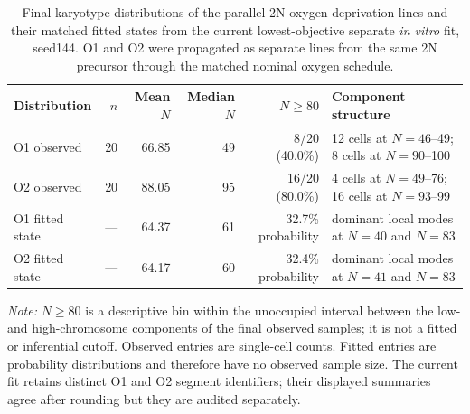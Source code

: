 \begin{table}[!htbp]
\centering
\small
\setlength{\tabcolsep}{5pt}
\caption{Final karyotype distributions of the parallel 2N oxygen-deprivation lines and their matched fitted states from the current lowest-objective separate \textit{in vitro} fit, seed144. O1 and O2 were propagated as separate lines from the same 2N precursor through the matched nominal oxygen schedule.}
\label{tab:invitro_o1_o2_final_karyotype}
\begin{tabular}{@{}lrrrrp{}@{}}
\toprule
Distribution & $n$ & Mean $N$ & Median $N$ & $N\geq80$ & Component structure \\
\midrule
O1 observed & 20 & 66.85 & 49 & 8/20 (40.0\%) & 12 cells at $N=46$--49; 8 cells at $N=90$--100 \\
O2 observed & 20 & 88.05 & 95 & 16/20 (80.0\%) & 4 cells at $N=49$--76; 16 cells at $N=93$--99 \\
O1 fitted state & --- & 64.37 & 61 & 32.7\% probability & dominant local modes at $N=40$ and $N=83$ \\
O2 fitted state & --- & 64.17 & 60 & 32.4\% probability & dominant local modes at $N=41$ and $N=83$ \\
\bottomrule
\end{tabular}
\par\vspace{0.5em}
\begin{minipage}{0.96\textwidth}
\footnotesize
\textit{Note:} $N\geq80$ is a descriptive bin within the unoccupied interval between the low- and high-chromosome components of the final observed samples; it is not a fitted or inferential cutoff. Observed entries are single-cell counts. Fitted entries are probability distributions and therefore have no observed sample size. The current fit retains distinct O1 and O2 segment identifiers; their displayed summaries agree after rounding but they are audited separately.
\end{minipage}
\end{table}
